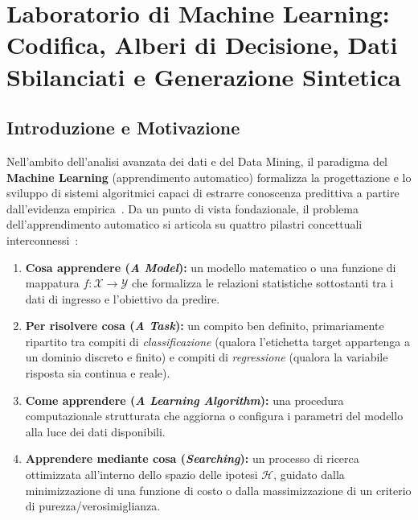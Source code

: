 \chapter{Laboratorio di Machine Learning: Codifica, Alberi di Decisione, Dati Sbilanciati e Generazione Sintetica}
\label{ch:lab-ml-decision-trees-dati-sbilanciati}

\FloatBarrier
\section{Introduzione e Motivazione}
\label{sec:dm-ml-intro}

Nell'ambito dell'analisi avanzata dei dati e del Data Mining, il paradigma del \textbf{Machine Learning} (apprendimento automatico) formalizza la progettazione e lo sviluppo di sistemi algoritmici capaci di estrarre conoscenza predittiva a partire dall'evidenza empirica~\cite{tan2018, han2011}. Da un punto di vista fondazionale, il problema dell'apprendimento automatico si articola su quattro pilastri concettuali interconnessi~\cite{mannocci2026imbalanced}:
\begin{enumerate}
    \item \textbf{Cosa apprendere (\textit{A Model}):} un modello matematico o una funzione di mappatura $f: \mathcal{X} \to \mathcal{Y}$ che formalizza le relazioni statistiche sottostanti tra i dati di ingresso e l'obiettivo da predire.
    \item \textbf{Per risolvere cosa (\textit{A Task}):} un compito ben definito, primariamente ripartito tra compiti di \textit{classificazione} (qualora l'etichetta target appartenga a un dominio discreto e finito) e compiti di \textit{regressione} (qualora la variabile risposta sia continua e reale).
    \item \textbf{Come apprendere (\textit{A Learning Algorithm}):} una procedura computazionale strutturata che aggiorna o configura i parametri del modello alla luce dei dati disponibili.
    \item \textbf{Apprendere mediante cosa (\textit{Searching}):} un processo di ricerca ottimizzata all'interno dello spazio delle ipotesi $\mathcal{H}$, guidato dalla minimizzazione di una funzione di costo o dalla massimizzazione di un criterio di purezza/verosimiglianza.
\end{enumerate}

